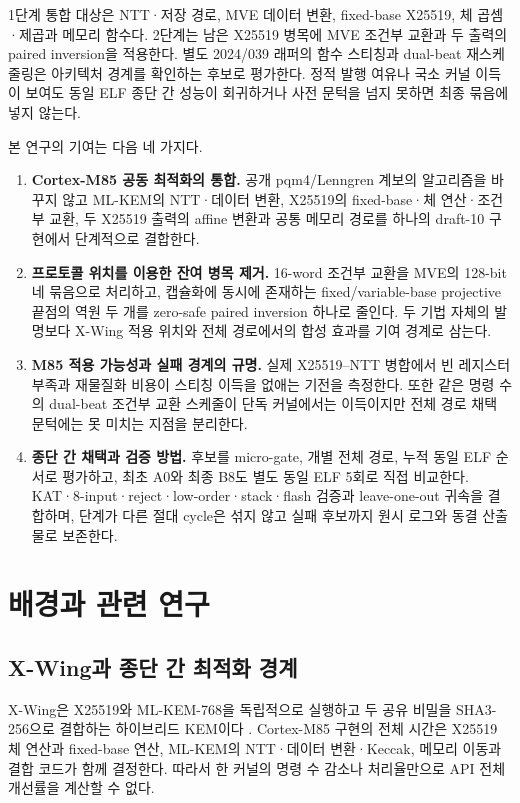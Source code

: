 \documentclass[runningheads,orivec]{llncs}
\newcommand{\xwing}{X-Wing}\newcommand{\slothy}{SLOTHY}\newcommand{\keccak}{Keccak-f[1600]}
\begin{document}
1단계 통합 대상은 NTT·저장 경로, MVE 데이터 변환, fixed-base X25519, 체 곱셈·제곱과
메모리 함수다. 2단계는 남은 X25519 병목에 MVE 조건부 교환과 두 출력의 paired
inversion을 적용한다. 별도 2024/039 래퍼의 함수 스티칭과 dual-beat 재스케줄링은
아키텍처 경계를 확인하는 후보로 평가한다. 정적 발행 여유나 국소 커널 이득이 보여도
동일 ELF 종단 간 성능이 회귀하거나 사전 문턱을 넘지 못하면 최종 묶음에 넣지 않는다.

본 연구의 기여는 다음 네 가지다.
\begin{enumerate}[leftmargin=*,itemsep=2pt]
\item \textbf{Cortex-M85 공동 최적화의 통합.} 공개 pqm4/Lenngren 계보의 알고리즘을
      바꾸지 않고 ML-KEM의 NTT·데이터 변환, X25519의 fixed-base·체 연산·조건부 교환,
      두 X25519 출력의 affine 변환과 공통 메모리 경로를 하나의 draft-10 구현에서
      단계적으로 결합한다.
\item \textbf{프로토콜 위치를 이용한 잔여 병목 제거.} 16-word 조건부 교환을 MVE의
      128-bit 네 묶음으로 처리하고, 캡슐화에 동시에 존재하는 fixed/variable-base
      projective 끝점의 역원 두 개를 zero-safe paired inversion 하나로 줄인다. 두 기법
      자체의 발명보다 \xwing{} 적용 위치와 전체 경로에서의 합성 효과를 기여 경계로 삼는다.
\item \textbf{M85 적용 가능성과 실패 경계의 규명.} 실제 X25519--NTT 병합에서 빈
      레지스터 부족과 재물질화 비용이 스티칭 이득을 없애는 기전을 측정한다. 또한 같은
      명령 수의 dual-beat 조건부 교환 스케줄이 단독 커널에서는 이득이지만 전체 경로
      채택 문턱에는 못 미치는 지점을 분리한다.
\item \textbf{종단 간 채택과 검증 방법.} 후보를 micro-gate, 개별 전체 경로, 누적
      동일 ELF 순서로 평가하고, 최초 A0와 최종 B8도 별도 동일 ELF 5회로 직접 비교한다.
      KAT·8-input·reject·low-order·stack·flash 검증과 leave-one-out 귀속을 결합하며,
      단계가 다른 절대 cycle은 섞지 않고 실패 후보까지 원시 로그와 동결 산출물로 보존한다.
\end{enumerate}

\FloatBarrier
\section{배경과 관련 연구}\label{sec:background}

\subsection{X-Wing과 종단 간 최적화 경계}

\xwing{}은 X25519와 ML-KEM-768을 독립적으로 실행하고 두 공유 비밀을
SHA3-256으로 결합하는 하이브리드 KEM이다 \cite{XWing24,XWingDraft10}.
Cortex-M85 구현의 전체 시간은 X25519 체 연산과 fixed-base 연산, ML-KEM의
NTT·데이터 변환·Keccak, 메모리 이동과 결합 코드가 함께 결정한다. 따라서 한 커널의
명령 수 감소나 처리율만으로 API 전체 개선률을 계산할 수 없다.
\end{document}
